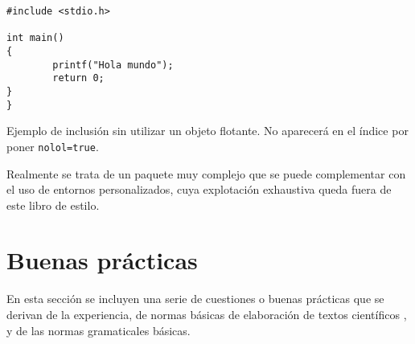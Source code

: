 \begin{lstlisting}[caption=Ejemplo ]
#include <stdio.h>

int main()
{
        printf("Hola mundo");
        return 0;
}
}
\end{lstlisting}


Ejemplo de inclusión sin utilizar un objeto flotante. No aparecerá en el índice por poner \lstinline[language=enparrafo]!nolol=true!.







Realmente se trata de un paquete muy complejo que se puede complementar con el uso de entornos personalizados, cuya explotación exhaustiva queda fuera de este libro de estilo.


\chapter {Buenas prácticas}


En esta sección se incluyen una serie de cuestiones o buenas prácticas que se derivan de la experiencia, de normas básicas de elaboración de textos científicos \cite{alba2009}, y de las normas gramaticales básicas.

